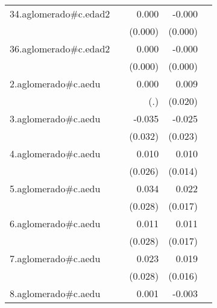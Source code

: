 {\begin{longtable}{l*{4}{D{.}{.}{-1}}}
\addlinespace
34.aglomerado#c.edad2&                     &       0.000         &      -0.000\sym{**} &                     \\
            &                     &     (0.000)         &     (0.000)         &                     \\
\addlinespace
36.aglomerado#c.edad2&                     &       0.000         &      -0.000         &                     \\
            &                     &     (0.000)         &     (0.000)         &                     \\
\addlinespace
2.aglomerado#c.aedu&                     &       0.000         &       0.009         &                     \\
            &                     &         (.)         &     (0.020)         &                     \\
\addlinespace
3.aglomerado#c.aedu&                     &      -0.035         &      -0.025         &                     \\
            &                     &     (0.032)         &     (0.023)         &                     \\
\addlinespace
4.aglomerado#c.aedu&                     &       0.010         &       0.010         &                     \\
            &                     &     (0.026)         &     (0.014)         &                     \\
\addlinespace
5.aglomerado#c.aedu&                     &       0.034         &       0.022         &                     \\
            &                     &     (0.028)         &     (0.017)         &                     \\
\addlinespace
6.aglomerado#c.aedu&                     &       0.011         &       0.011         &                     \\
            &                     &     (0.028)         &     (0.017)         &                     \\
\addlinespace
7.aglomerado#c.aedu&                     &       0.023         &       0.019         &                     \\
            &                     &     (0.028)         &     (0.016)         &                     \\
\addlinespace
8.aglomerado#c.aedu&                     &       0.001         &      -0.003         &                     \\

\end{longtable}}
